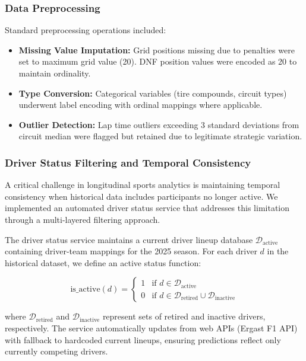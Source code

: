\documentclass[conference]{IEEEtran}
\begin{document}
\subsubsection{Data Preprocessing}

Standard preprocessing operations included:
\begin{itemize}
    \item \textbf{Missing Value Imputation:} Grid positions missing due to penalties were set to maximum grid value (20). DNF position values were encoded as 20 to maintain ordinality.
    \item \textbf{Type Conversion:} Categorical variables (tire compounds, circuit types) underwent label encoding with ordinal mappings where applicable.
    \item \textbf{Outlier Detection:} Lap time outliers exceeding 3 standard deviations from circuit median were flagged but retained due to legitimate strategic variation.
\end{itemize}

\subsubsection{Driver Status Filtering and Temporal Consistency}

A critical challenge in longitudinal sports analytics is maintaining temporal consistency when historical data includes participants no longer active. We implemented an automated driver status service that addresses this limitation through a multi-layered filtering approach.

The driver status service maintains a current driver lineup database $\mathcal{D}_{\text{active}}$ containing driver-team mappings for the 2025 season. For each driver $d$ in the historical dataset, we define an active status function:

\begin{equation}
\text{is\_active}(d) = \begin{cases}
1 & \text{if } d \in \mathcal{D}_{\text{active}} \\
0 & \text{if } d \in \mathcal{D}_{\text{retired}} \cup \mathcal{D}_{\text{inactive}}
\end{cases}
\end{equation}

where $\mathcal{D}_{\text{retired}}$ and $\mathcal{D}_{\text{inactive}}$ represent sets of retired and inactive drivers, respectively. The service automatically updates from web APIs (Ergast F1 API) with fallback to hardcoded current lineups, ensuring predictions reflect only currently competing drivers.
\end{document}
